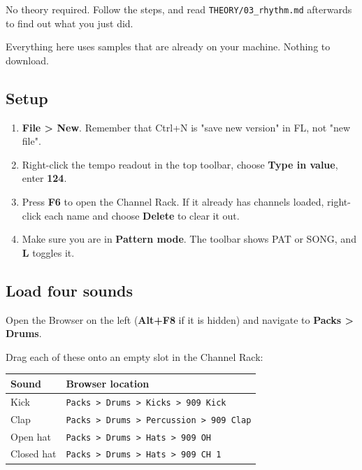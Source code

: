 No theory required. Follow the steps, and read \texttt{THEORY/03\_rhythm.md} afterwards to find out
what you just did.

Everything here uses samples that are already on your machine. Nothing to download.

\subsection{Setup}\label{fl02_first_beat-setup}

\begin{enumerate}
\def\labelenumi{\arabic{enumi}.}
\tightlist
\item
  \textbf{File \textgreater{} New}. Remember that Ctrl+N is "save new version" in FL, not "new file".
\item
  Right-click the tempo readout in the top toolbar, choose \textbf{Type in value}, enter \textbf{124}.
\item
  Press \textbf{F6} to open the Channel Rack. If it already has channels loaded, right-click each
  name and choose \textbf{Delete} to clear it out.
\item
  Make sure you are in \textbf{Pattern mode}. The toolbar shows PAT or SONG, and \textbf{L} toggles it.
\end{enumerate}

\subsection{Load four sounds}\label{fl02_first_beat-load-four-sounds}

Open the Browser on the left (\textbf{Alt+F8} if it is hidden) and navigate to \textbf{Packs \textgreater{} Drums}.

Drag each of these onto an empty slot in the Channel Rack:

{\def\LTcaptype{none} %
\begin{longtable}[]{@{}ll@{}}
\toprule\noalign{}
Sound & Browser location \\
\midrule\noalign{}
\endhead
\bottomrule\noalign{}
\endlastfoot
Kick & \texttt{Packs\ \textgreater{}\ Drums\ \textgreater{}\ Kicks\ \textgreater{}\ 909\ Kick} \\
Clap & \texttt{Packs\ \textgreater{}\ Drums\ \textgreater{}\ Percussion\ \textgreater{}\ 909\ Clap} \\
Open hat & \texttt{Packs\ \textgreater{}\ Drums\ \textgreater{}\ Hats\ \textgreater{}\ 909\ OH} \\
Closed hat & \texttt{Packs\ \textgreater{}\ Drums\ \textgreater{}\ Hats\ \textgreater{}\ 909\ CH\ 1} \\
\end{longtable}
}

